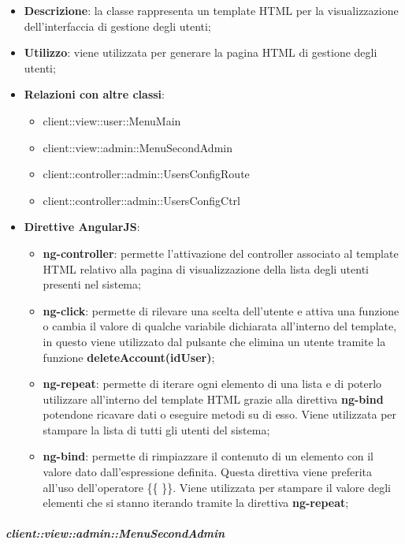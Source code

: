 			\begin{itemize}
				\item \textbf{Descrizione}: la classe rappresenta un template HTML per la visualizzazione dell'interfaccia di gestione degli utenti;
				\item \textbf{Utilizzo}: viene utilizzata per generare la pagina HTML di gestione degli utenti;
				\item \textbf{Relazioni con altre classi}:
					\begin{itemize}
						\item client::view::user::MenuMain
						\item client::view::admin::MenuSecondAdmin
						\item client::controller::admin::UsersConfigRoute
						\item client::controller::admin::UsersConfigCtrl
					\end{itemize}
				\item \textbf{Direttive AngularJS}:
					\begin{itemize}
						\item \textbf{ng-controller}: permette l'attivazione del controller associato al template HTML relativo alla pagina di visualizzazione della lista degli utenti presenti nel sistema;
						\item \textbf{ng-click}: permette di rilevare una scelta dell'utente e attiva una funzione o cambia il valore di qualche variabile dichiarata all'interno del template, in questo viene utilizzato dal pulsante che elimina un utente tramite la funzione \textbf{deleteAccount(idUser)};
						\item \textbf{ng-repeat}: permette di iterare ogni elemento di una lista e di poterlo utilizzare all'interno del template HTML grazie alla direttiva \textbf{ng-bind} potendone ricavare dati o eseguire metodi su di esso. Viene utilizzata per stampare la lista di tutti gli utenti del sistema;
						\item \textbf{ng-bind}: permette di rimpiazzare il contenuto di un elemento con il valore dato dall'espressione definita. Questa direttiva viene preferita all'uso dell'operatore \{\{ \}\}. Viene utilizzata per stampare il valore degli elementi che si stanno iterando tramite la direttiva \textbf{ng-repeat};
					\end{itemize}
			\end{itemize}

		\subparagraph{client::view::admin::MenuSecondAdmin} %
		\label{subp:bdsm_app_client_view_admin_menusecondadmin}


